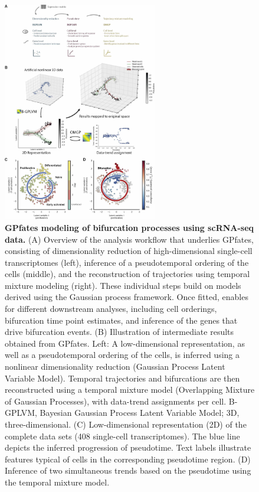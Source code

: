 \begin{figure}
    \centering
    \includegraphics[width=0.6\textwidth]{"Fig2"}
    \caption[GPfates modeling of bifurcation processes using scRNA-seq data]{\textbf{GPfates modeling of bifurcation processes using scRNA-seq data.} (A) Overview of the analysis workflow that underlies GPfates, consisting of dimensionality reduction of high-dimensional single-cell transcriptomes (left), inference of a pseudotemporal ordering of the cells (middle), and the reconstruction of trajectories using temporal mixture modeling (right). These individual steps build on models derived using the Gaussian process framework. Once fitted,  enables for different downstream analyses, including cell orderings, bifurcation time point estimates, and inference of the genes that drive bifurcation events. (B) Illustration of intermediate results obtained from GPfates. Left: A low-dimensional representation, as well as a pseudotemporal ordering of the cells, is inferred using a nonlinear dimensionality reduction (Gaussian Process Latent Variable Model). Temporal trajectories and bifurcations are then reconstructed using a temporal mixture model (Overlapping Mixture of Gaussian Processes), with data-trend assignments per cell. B-GPLVM, Bayesian Gaussian Process Latent Variable Model; 3D, three-dimensional. (C) Low-dimensional representation (2D) of the complete data sets (408 single-cell transcriptomes). The blue line depicts the inferred progression of pseudotime. Text labels illustrate features typical of cells in the corresponding pseudotime region. (D) Inference of two simultaneous trends based on the pseudotime using the temporal mixture model.}
    \label{fig:models}
\end{figure}

